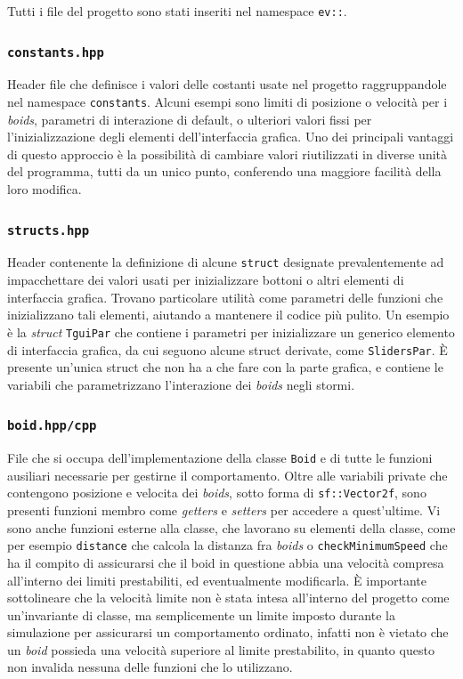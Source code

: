 \documentclass[10pt,a4paper]{article}
\begin{document}
Tutti i file del progetto sono stati inseriti nel namespace \texttt{ev::}.

\subsubsection{\texttt{constants.hpp}}

Header file che definisce i valori delle costanti usate nel progetto raggruppandole nel namespace \texttt{constants}. Alcuni esempi sono limiti di posizione o velocità per i \textit{boids}, parametri di interazione di default, o ulteriori valori fissi per l'inizializzazione degli elementi dell'interfaccia grafica. Uno dei principali vantaggi di questo approccio è la possibilità di cambiare valori riutilizzati in diverse unità del programma, tutti da un unico punto, conferendo una maggiore facilità della loro modifica.

\subsubsection{\texttt{structs.hpp}}

Header contenente la definizione di alcune \texttt{struct} designate prevalentemente ad impacchettare dei valori usati per inizializzare bottoni o altri elementi di interfaccia grafica. Trovano particolare utilità come parametri delle funzioni che inizializzano tali elementi, aiutando a mantenere il codice più pulito. Un esempio è la \textit{struct} \texttt{TguiPar} che contiene i parametri per inizializzare un generico elemento di interfaccia grafica, da cui seguono alcune struct derivate, come \texttt{SlidersPar}. È presente un'unica struct che non ha a che fare con la parte grafica, e contiene le variabili che parametrizzano l'interazione dei \textit{boids} negli stormi.

\subsubsection{\texttt{boid.hpp/cpp}}

File che si occupa dell'implementazione della classe \texttt{Boid} e di tutte le funzioni ausiliari necessarie per gestirne il comportamento. Oltre alle variabili private che contengono posizione e velocita dei \textit{boids}, sotto forma di \texttt{sf::Vector2f}, sono presenti funzioni membro come \textit{getters} e \textit{setters} per accedere a quest'ultime. Vi sono anche funzioni esterne alla classe, che lavorano su elementi della classe, come per esempio \texttt{distance} che calcola la distanza fra \textit{boids} o \texttt{checkMinimumSpeed} che ha il compito di assicurarsi che il boid in questione abbia una velocità compresa all'interno dei limiti prestabiliti, ed eventualmente modificarla. È importante sottolineare che la velocità limite non è stata intesa all'interno del progetto come un'invariante di classe, ma semplicemente un limite imposto durante la simulazione per assicurarsi un comportamento ordinato, infatti non è vietato che un \textit{boid} possieda una velocità superiore al limite prestabilito, in quanto questo non invalida nessuna delle funzioni che lo utilizzano.
\end{document}
